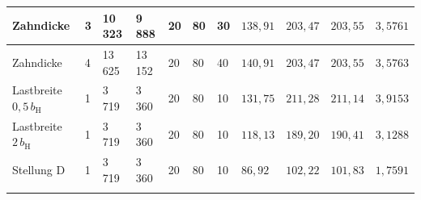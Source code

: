 \begin{table}[htbp]
\begin{tabular}{L{2.1cm}llllllllll}
        \hline
        Zahndicke & 3 & 10\,323 & 9\,888 & 20 & 80 & 30 & $138{,}91$ & $203{,}47$ & $203{,}55$ & $3{,}5761$ \\
        \hline
        Zahndicke & 4 & 13\,625 & 13\,152 & 20 & 80 & 40 & $140{,}91$ & $203{,}47$ & $203{,}55$ & $3{,}5763$ \\
        \hline
        Lastbreite $0{,}5\,b_{\mathrm{H}}$ & 1 & 3\,719 & 3\,360 & 20 & 80 & 10 & $131{,}75$ & $211{,}28$ & $211{,}14$ & $3{,}9153$ \\
        \hline
        Lastbreite $2\,b_{\mathrm{H}}$ & 1 & 3\,719 & 3\,360 & 20 & 80 & 10 & $118{,}13$ & $189{,}20$ & $190{,}41$ & $3{,}1288$ \\
        \hline
        Stellung D & 1 & 3\,719 & 3\,360 & 20 & 80 & 10 & $86{,}92$ & $102{,}22$ & $101{,}83$ & $1{,}7591$ \\
        \hline
    \end{tabular}
\end{table}
